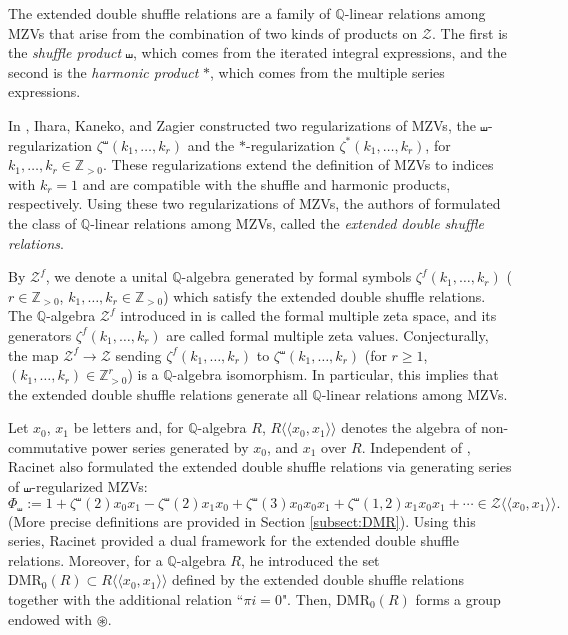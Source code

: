 \documentclass[15pt,oneside,reqno]{amsart}
\theoremstyle{remark}{
\newtheorem{lem}[df]{Lemma}
\newtheorem{prop}[df]{Proposition}
\newtheorem{ex}[df]{Example}
\newtheorem{rmk}[df]{Remark}
}
\newcommand{\Q}{\mathbb{Q}}
\newcommand{\DMR}{\mathrm{DMR}}
\begin{document}
The extended double shuffle relations are a family of $\mathbb{Q}$-linear relations among MZVs that arise from the combination of two kinds of products on $\mathcal{Z}$. The first is the \textit{shuffle product} $\shuffle$, which comes from the iterated integral expressions, and the second is the \emph{harmonic product} $*$, which comes from the multiple series expressions.



In \cite{Ihara-Kaneko-Zagier}, Ihara, Kaneko, and Zagier constructed two regularizations of MZVs, the $\shuffle$-regularization $\zeta^{\shuffle}(k_1,\ldots,k_r)$ and the $*$-regularization $\zeta^{*}(k_1,\ldots,k_r)$, for $k_1,\ldots,k_r\in\mathbb{Z}_{>0}$.
These regularizations extend the definition of MZVs to indices with $k_r=1$ and are compatible with the shuffle and harmonic products, respectively.
Using these two regularizations of MZVs, the authors of \cite{Ihara-Kaneko-Zagier} formulated the class of $\mathbb{Q}$-linear relations among MZVs, called the \emph{extended double shuffle relations}.



By $\mathcal{Z}^f$, we denote a unital $\Q$-algebra generated by formal symbols $\zeta^f(k_1,\ldots,k_r)$ ($r\in\mathbb{Z}_{>0}$, $k_1,\ldots,k_r\in\mathbb{Z}_{>0}$) which satisfy the extended double shuffle relations. The $\Q$-algebra $\mathcal{Z}^f$ introduced in \cite{Ihara-Kaneko-Zagier} is called the formal multiple zeta space, and its generators $\zeta^f(k_1,\ldots,k_r)$ are called formal multiple zeta values.
Conjecturally, the map $\mathcal{Z}^f\to\mathcal{Z}$ sending $\zeta^f(k_1,\ldots,k_r)$ to $\zeta^{\shuffle}(k_1,\ldots,k_r)$ (for $r\ge1$, $(k_1,\ldots,k_r)\in\mathbb{Z}_{>0}^r$) is a $\mathbb{Q}$-algebra isomorphism.
In particular, this implies that the extended double shuffle relations generate all $\mathbb{Q}$-linear relations among MZVs.



Let $x_0$, $x_1$ be letters and, for $\Q$-algebra $R$, $R\langle \langle x_0,x_1 \rangle\rangle$ denotes the algebra of non-commutative power series generated by $x_0$, and $x_1$ over $R$.
Independent of \cite{Ihara-Kaneko-Zagier}, Racinet \cite{Racinet} also formulated the extended double shuffle relations via generating series of $\shuffle$-regularized MZVs:
\[
\Phi_{\shuffle} := 1 + \zeta^{\shuffle}(2) x_0x_1 - \zeta^{\shuffle}(2) x_1x_0
+ \zeta^{\shuffle}(3)x_0x_0x_1 + \zeta^{\shuffle}(1,2)x_1x_0x_1 + \cdots \in \mathcal{Z}\langle\langle x_0,x_1 \rangle\rangle.
\]
(More precise definitions are provided in Section \ref{subsect:DMR}).
Using this series, Racinet \cite{Racinet} provided a dual framework for the extended double shuffle relations.
Moreover, for a $\Q$-algebra $R$, he introduced the set $\DMR_0(R) \subset R\langle \langle x_0,x_1\rangle\rangle$ defined by the extended double shuffle relations together with the additional relation ``$\pi i = 0$".
Then, $\DMR_0(R)$ forms a group endowed with $\circledast$.
\end{document}
